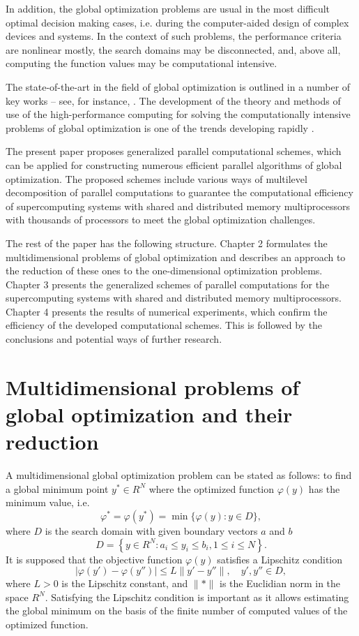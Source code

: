 \documentclass[12pt]{amsart}
\begin{document}
In addition, the global optimization problems are usual in the most difficult optimal decision making cases, i.e. during the computer-aided design of complex devices and systems. In the context of such problems, the performance criteria are nonlinear mostly, the search domains may be disconnected, and, above all, computing the function values may be computational intensive.

The state-of-the-art in the field of global optimization is outlined in a number of key works – see, for instance, \cite{Floudas, Locatelli, Strongin1, Pardalos, Sergeyev1, Paulavicius}. The development of the theory and methods of use of the high-performance computing for solving the computationally intensive problems of global optimization is one of the trends developing rapidly \cite{Strongin1, Ciegis, Luque, Strongin2}.

The present paper proposes generalized parallel computational schemes, which can be applied for constructing numerous efficient parallel algorithms of global optimization. The proposed schemes include various ways of multilevel decomposition of parallel computations to guarantee the computational efficiency of supercomputing systems with shared and distributed memory multiprocessors with thousands of processors to meet the global optimization challenges.

The rest of the paper has the following structure. Chapter 2 formulates the multidimensional problems of global optimization and describes an approach to the reduction of these ones to the one-dimensional optimization problems. Chapter 3 presents the generalized schemes of parallel computations for the supercomputing systems with shared and distributed memory multiprocessors. Chapter 4 presents the results of numerical experiments, which confirm the efficiency of the developed computational schemes. This is followed by the conclusions and potential ways of further research.


\section{Multidimensional problems of global optimization and their reduction}

A multidimensional global optimization problem can be stated as follows: to find a global minimum point $y^\ast \in R^N$ where the optimized function $\varphi(y)$ has the minimum value, i.e.
\begin{equation}
\varphi^\ast = \varphi(y^\ast) = \min \{\varphi(y): y\in D \},
\end{equation}
where $D$ is the search domain with given boundary vectors $a$ and $b$
\[
D=\left\{y\in R^N: a_i\leq y_i \leq b_i, 1\leq i \leq N\right\}.
\]
It is supposed that the objective function $\varphi(y)$ satisfies a Lipschitz condition
\begin{equation}
\vert \varphi(y') - \varphi(y'') \vert \leq L\| y' - y'' \|, \quad y', y'' \in D,
\end{equation}
where $L > 0$ is the Lipschitz constant, and $\|\ast\|$ is the Euclidian norm in the space $R^N$. Satisfying the Lipschitz condition is important as it allows estimating the global minimum on the basis of the finite number of computed values of the optimized function.
\end{document}
